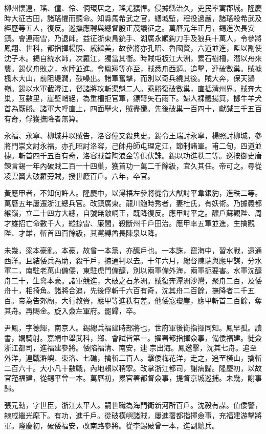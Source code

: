 \begin{pinyinscope}
柳州懷遠，瑤、僮、伶、侗環居之，瑤尤獷悍。侵據縣治久，吏民率寓郡城。隆慶時大征古田，諸瑤懼而聽命。知縣馬希武之官，繕城塹，程役過嚴，諸瑤殺希武及經歷等五人，復反。巡撫應聘與總督殷正茂議征之。萬曆元年正月，錫進次長安鎮。會連雨雪，乃退師。益征浙東鳥銃手、湖廣永順鉤刀手及狼兵十萬人，令參將鳳翔、世科，都指揮楊照、戚繼美，故參將亦孔昭、魯國賢，六道並進，監以副使沈子木。錫自統水師，次羅江，獨當其衝。時賊屯板江大洲，累石樹柵，潛以舟來襲。錫伏舟敗之，水陸並進。會鳳翔等亦至，賊悉舟西遁。追擊，連破數巢。賊據楓木大山，前阻堤澗，鼓噪出。諸軍奮擊，而別以奇兵繞其後。賊大奔，保天鵝嶺。錫以水軍截潯江，督諸將攻斬渠魁二人。乘勝復破數巢，直抵清州界。賊奔大巢，亙數里，崖壁峭絕，為重柵拒官軍，鏢弩矢石雨下。婦人裸體揚箕，擲牛羊犬首為厭勝。諸軍大呼直上，四面舉火，賊盡殲。先後破巢一百四十，獻馘三千五百有奇，俘獲撫降者無算。

永福、永寧、柳城并以賊告，洛容僮又殺典史。錫令王瑞討永寧，楊照討柳城，參將門崇文討永福，亦孔昭討洛容，己帥舟師屯理定江，節制諸軍。甫二旬，四道並捷。斬首四千五百有奇，洛容賊首陶浪金等俱伏誅。錫以功進秩二等。巡按御史唐鍊言錫一年內破賊二百一十四巢，獲首功一萬二千餘級，宜久其任。帝可之。尋從凌雲翼大破羅旁賊，授世廕百戶。六年，卒官。

黃應甲者，不知何許人。隆慶中，以潯梧左參將從俞大猷討平韋銀豹，進秩二等。萬曆五年屢遷浙江總兵官。改鎮廣東。龍川鮑時秀者，妻杜氏，有妖術。乃據義都緱嶺，立二十四方大總，自號無敵峒王，既降復反。應甲討平之。醿戶蘇觀陛、周才雄招亡命數千人，縱掠雷、廉間，殺斷州千戶田治。應甲率五軍並進，生擒觀陛、才雄，斬首四百餘級，其黨縛酋長陳泉以降。

未幾，梁本豪亂。本豪，故曾一本黨，亦醿戶也。一本誅，竄海中，習水戰，遠通西洋。且結倭兵為助，殺千戶，掠通判以去。十年六月，總督陳瑞與應甲謀，分水軍二，南駐老萬山備倭，東駐虎門備醿，別以兩軍備外海，兩軍扼要害。水軍沈醿舟二十，生禽本豪。諸軍競進，大破之石茅洲。賊復奔潭洲沙灣，聚舟二百，及倭舟十，相掎角。諸將合追，先後俘斬千六百有奇，沈其舟二百餘，撫降者二千五百。帝為告郊廟，大行敘賚，應甲等進秩有差。他倭寇瓊崖，應甲斬首二百餘，奪其舟。再賜金。旋入僉左軍府。罷歸，卒。

尹鳳，字德輝，南京人。錫總兵福建時部將也，世府軍後衛指揮同知。鳳早孤。讀書，嫻騎射。嘉靖中舉武科，鄉、會試皆第一。擢署都指揮僉事，備倭福建。徙僉浙江都司，進福建參將。倭陷福清、南安，連宗出海。鳳邀擊，沈其七舟。追至外洋，連戰滸嶼、東洛、七礁，擒斬二百人。擊倭梅花洋，走之，追至橫山，擒斬二百六十。大小凡十數戰，內地賴以稍寧。改掌浙江都司，謝病歸。隆慶初，以故官蒞福建，從錫平曾一本。萬曆初，累官署都督僉事，提督京城巡捕。未幾，謝事歸。

張元勳，字世臣，浙江太平人。嗣世職為海門衛新河所百戶。沈毅有謀。值倭警，隸戚繼光麾下。有功，進千戶。從破橫嶼諸賊，屢進署都指揮僉事，充福建游擊將軍。隆慶初，破倭福安，改南路參將。從李錫破曾一本，進副總兵。


\end{pinyinscope}
